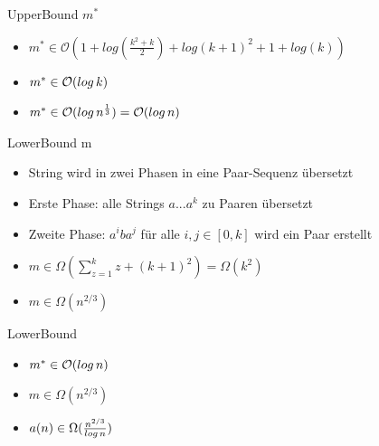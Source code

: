 \begin{frame}{\FrameName}
\begin{block}{UpperBound $m^*$}
	\begin{center}
	\end{center}
	\begin{itemize}[<+->]
		\item $m^* \in \mathcal{O}(1+ log(\frac{k^2+k}{2}) + log(k+1)^2 + 1+ log(k))$
		\item $m^* \in \mathcal{O}(log \thinspace k)$
		\item $m^* \in \mathcal{O}(log \thinspace n^\frac{1}{3}) = \mathcal{O}(log \thinspace n)$
	\end{itemize}
\end{block}
\end{frame}

\begin{frame}{\FrameName}
\begin{block}{LowerBound m}
	\begin{center}
	\end{center}
	\begin{itemize}[<+->]
		\item String wird in zwei Phasen in eine Paar-Sequenz übersetzt
		\item Erste Phase: alle Strings $a...a^k$ zu Paaren übersetzt
		\item Zweite Phase: $a^iba^j$ für alle $i,j \in [0,k]$ wird ein Paar erstellt
		\item $m \in \Omega(\sum_{z=1}^k z + (k+1)^2) = \Omega(k^2)$
		\item $m \in \Omega(n^{2/3})$
	\end{itemize}
\end{block}
\end{frame}

\begin{frame}{\FrameName}
\begin{block}{LowerBound}
	\begin{center}
	\end{center}
	\begin{itemize}[<+->]
		\item $m^* \in \mathcal{O}(log \thinspace n)$
		\item $m \in \Omega(n^{2/3})$
		\item $a(n) \in \Omega(\frac{n^{2/3}}{log \thinspace n})$
	\end{itemize}
\end{block}
\end{frame}
